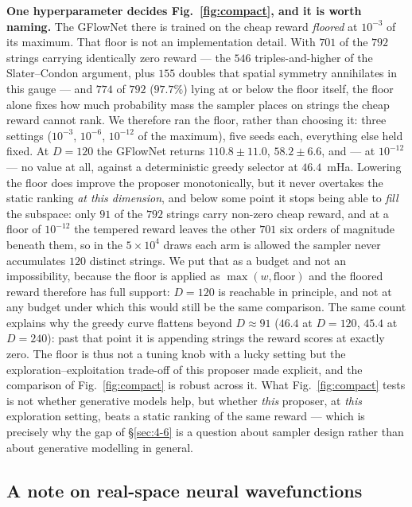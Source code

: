 \documentclass[onecolumn,a4paper]{quantumarticle}
\begin{document}
\textbf{One hyperparameter decides Fig.~\ref{fig:compact}, and it is worth naming.} The GFlowNet there is trained on the cheap reward \emph{floored} at $10^{-3}$ of its maximum. That floor is not an implementation detail. With $701$ of the $792$ strings carrying identically zero reward --- the $546$ triples-and-higher of the Slater--Condon argument, plus $155$ doubles that spatial symmetry annihilates in this gauge --- and $774$ of $792$ ($97.7\%$) lying at or below the floor itself, the floor alone fixes how much probability mass the sampler places on strings the cheap reward cannot rank. We therefore ran the floor, rather than choosing it: three settings ($10^{-3}$, $10^{-6}$, $10^{-12}$ of the maximum), five seeds each, everything else held fixed. At $D{=}120$ the GFlowNet returns $110.8\pm11.0$, $58.2\pm6.6$, and --- at $10^{-12}$ --- no value at all, against a deterministic greedy selector at $46.4$~mHa. Lowering the floor does improve the proposer monotonically, but it never overtakes the static ranking \emph{at this dimension}, and below some point it stops being able to \emph{fill} the subspace: only $91$ of the $792$ strings carry non-zero cheap reward, and at a floor of $10^{-12}$ the tempered reward leaves the other $701$ six orders of magnitude beneath them, so in the $5\times10^{4}$ draws each arm is allowed the sampler never accumulates $120$ distinct strings. We put that as a budget and not an impossibility, because the floor is applied as $\max(w,\text{floor})$ and the floored reward therefore has full support: $D{=}120$ is reachable in principle, and not at any budget under which this would still be the same comparison. The same count explains why the greedy curve flattens beyond $D{\approx}91$ ($46.4$ at $D{=}120$, $45.4$ at $D{=}240$): past that point it is appending strings the reward scores at exactly zero. The floor is thus not a tuning knob with a lucky setting but the exploration--exploitation trade-off of this proposer made explicit, and the comparison of Fig.~\ref{fig:compact} is robust across it. What Fig.~\ref{fig:compact} tests is not whether generative models help, but whether \emph{this} proposer, at \emph{this} exploration setting, beats a static ranking of the same reward --- which is precisely why the gap of \S\ref{sec:4-6} is a question about sampler design rather than about generative modelling in general.


\subsection{A note on real-space neural wavefunctions}\label{sec:4-7}
\end{document}
